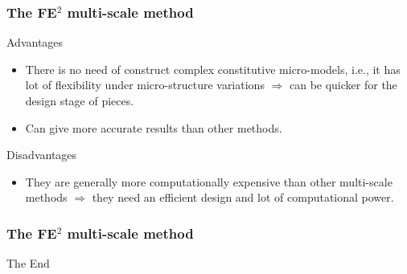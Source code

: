 \documentclass[usenames,dvipsnames]{beamer}
\begin{document}
\begin{frame}
\frametitle{The FE$^2$ multi-scale method}
{\color{ForestGreen}Advantages}
\begin{itemize}
\item There is no need of construct complex constitutive micro-models, i.e., it has lot of flexibility under
micro-structure variations $\Rightarrow$ can be quicker for the design
stage of pieces.
\item Can give more accurate results than other methods.
\end{itemize}

{\color{Red}Disadvantages}
\begin{itemize}
\item They are generally more computationally expensive than other multi-scale methods $\Rightarrow$ they need an efficient
design and lot of computational power. 
\end{itemize}
\end{frame}


\begin{frame}
\frametitle{The FE$^2$ multi-scale method}

\begin{figure}[!ht]
\resizebox{1.0\linewidth}{!}{}
\end{figure}
\end{frame}


\begin{frame}
\begin{figure}[!ht]
\resizebox{0.8\linewidth}{!}{}
\end{figure}
\end{frame}


\begin{frame}
\begin{figure}[!ht]
\resizebox{1.0\linewidth}{!}{}
\end{figure}
\end{frame}


\begin{frame}
\Huge{\centerline{The End}}
\end{frame}

\end{document}
